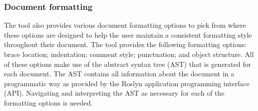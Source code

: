 \subsubsection{Document formatting}
The tool also provides various document formatting options to pick from where these options are designed to help the user maintain a consistent formatting style throughout their document. The tool provides the following formatting options: brace location; indentation; comment style; punctuation; and object structure. All of these options make use of the abstract syntax tree (AST) that is generated for each document. The AST contains all information about the document in a programmatic way as provided by the Roslyn application programming interface (API). Navigating and interpreting the AST as necessary for each of the formatting options is needed.

